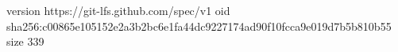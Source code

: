 version https://git-lfs.github.com/spec/v1
oid sha256:c00865e105152e2a3b2bc6e1fa44dc9227174ad90f10fcca9e019d7b5b810b55
size 339
